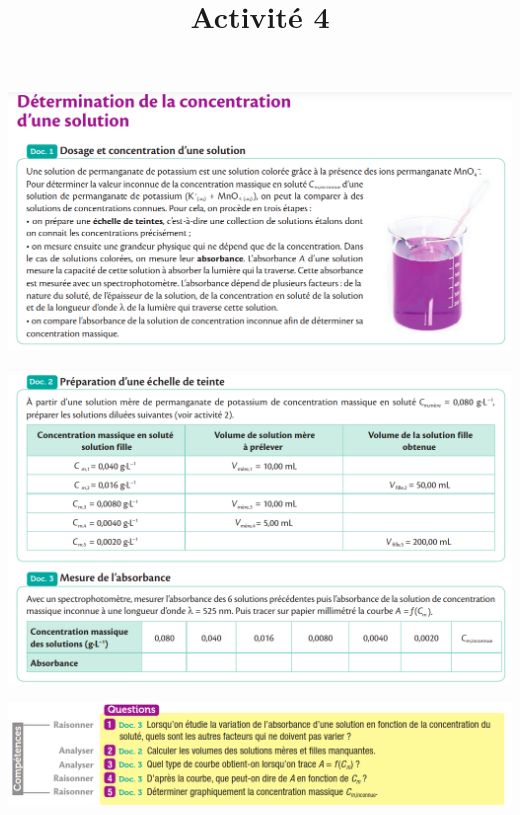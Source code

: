 \documentclass[10pt]{article}
\newcommand{\myscale}{0.5}
\newcommand{\titreActivite}{\huge Activité 4} %
\begin{document}
\date{}
\title{\titreActivite}
\maketitle %



\begin{center}

	\includegraphics[scale=\myscale]{assets/d1.png}

	\includegraphics[scale=\myscale]{assets/d2-3.png}

	\includegraphics[scale=\myscale]{assets/q.png}


\end{center}
\end{document}
